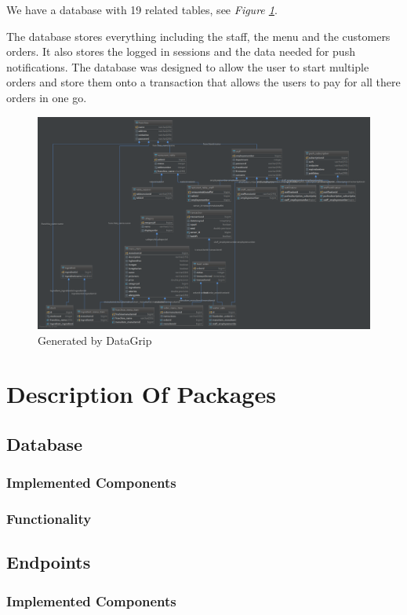 \documentclass[12pt, twoside, a4paper]{report}
\begin{document}
We have a database with 19 related tables, see \textit{Figure \ref{fig:data}}. 

The database stores everything including the staff, the menu and the customers orders. 
It also stores the logged in sessions and the data needed for push notifications.
The database was designed to allow the user to start multiple orders and store them onto a transaction that allows the users to pay for all there orders in one go.

\begin{figure}[H]
  \centering
  \includegraphics[width=15cm]{database.png}
  \caption{Generated by DataGrip}
  \label{fig:data}
\end{figure}

\chapter*{Description Of Packages}
\section*{Database}\label{sec:database}
\subsection*{Implemented Components}
\subsection*{Functionality}

\section*{Endpoints}\label{sec:endpoints}
\subsection*{Implemented Components}
\end{document}
